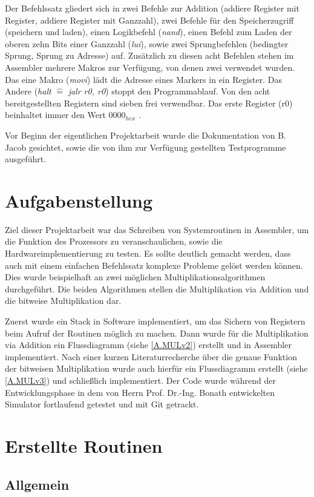 \documentclass[fleqn, a4paper, 11pt]{article}       %
\begin{document}
Der Befehlssatz gliedert sich in zwei Befehle zur Addition (addiere Register mit Register, addiere Register mit Ganzzahl), zwei Befehle für den Speicherzugriff (speichern und laden), einen Logikbefehl (\emph{nand}), einen Befehl zum Laden der oberen zehn Bits einer Ganzzahl (\emph{lui}), sowie zwei Sprungbefehlen (bedingter Sprung, Sprung zu Adresse) auf. Zusätzlich zu diesen acht Befehlen stehen im Assembler mehrere Makros zur Verfügung, von denen zwei verwendet wurden. Das eine Makro (\emph{movi}) lädt die Adresse eines Markers in ein Register. Das Andere (\emph{halt} $\widehat{=}$ \emph{jalr r0, r0}) stoppt den Programmablauf. Von den acht bereitgestellten Registern sind sieben frei verwendbar. Das erste Register (r0) beinhaltet immer den Wert $0000_{hex}$ \cite[1]{JACOBInstr}.

Vor Beginn der eigentlichen Projektarbeit wurde die Dokumentation von B. Jacob gesichtet, sowie die von ihm zur Verfügung gestellten Testprogramme ausgeführt.


\section{Aufgabenstellung}
Ziel dieser Projektarbeit war das Schreiben von Systemroutinen in Assembler, um die Funktion des Prozessors zu veranschaulichen, sowie die Hardwareimplementierung zu testen. Es sollte deutlich gemacht werden, dass auch mit einem einfachen Befehlssatz komplexe Probleme gelöst werden können. Dies wurde beispielhaft an zwei möglichen Multiplikationsalgorithmen durchgeführt. Die beiden Algorithmen stellen die Multiplikation via Addition und die bitweise Multiplikation dar. 

Zuerst wurde ein Stack in Software implementiert, um das Sichern von Registern beim Aufruf der Routinen möglich zu machen. Dann wurde für die Multiplikation via Addition ein Flussdiagramm (siehe \ref{A.MULv2}) erstellt und in Assembler implementiert. Nach einer kurzen Literaturrecherche über die genaue Funktion der bitweisen Multiplikation wurde auch hierfür ein Flussdiagramm erstellt (siehe \ref{A.MULv3}) und schließlich implementiert. Der Code wurde während der Entwicklungsphase in dem von Herrn Prof. Dr.-Ing. Bonath entwickelten Simulator fortlaufend getestet und mit Git getrackt.

\section{Erstellte Routinen}
\subsection{Allgemein}
\end{document}
